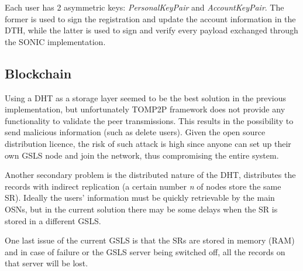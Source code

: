 Each user has 2 asymmetric keys: \textit{PersonalKeyPair} and \textit{AccountKeyPair}. The former is used to sign the registration and update the account information in the DTH, while the latter is used to sign and verify every payload exchanged through the SONIC implementation.

\subsection{Blockchain}

Using a DHT as a storage layer seemed to be the best solution in the previous implementation, but unfortunately TOMP2P framework \cite{tomp2p_2009} does not provide any functionality to validate the peer transmissions. 
This results in the possibility to send malicious information (such as delete users).
Given the open source distribution licence, the risk of such attack is high since anyone can set up their own GSLS node and join the network, thus compromising the entire system. \par

Another secondary problem is the distributed nature of the DHT, distributes the records with indirect replication \cite{_tomp2p_2017} (a certain number \textit{n} of nodes store the same SR). Ideally the users' information must be quickly retrievable by the main OSNs, but in the current solution there may be some delays when the SR is stored in a different GSLS. \par

One last issue of the current GSLS is that the SRs are stored in memory (RAM) and in case of failure or the GSLS server being switched off, all the records on that server will be lost. \par













